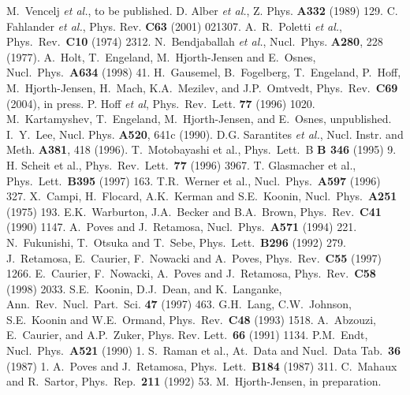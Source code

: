 \documentclass[twoside,12pt]{article}
\begin{document}
\begin{thebibliography}{200}
M.~Vencelj {\it et al.}, to be published.
 D. Alber {\it et al.}, Z. Phys. {\bf A332} (1989) 129.
 C. Fahlander {\it et al.}, Phys. Rev. {\bf C63} (2001) 021307.
 A.~R.~Poletti {\it et al.},
Phys.~Rev.~{\bf C10}  (1974) 2312.
 N.~Bendjaballah {\it et al.},
Nucl.~Phys. {\bf A280}, 228 (1977).
 A.\ Holt, T.\ Engeland, M.\ Hjorth-Jensen and E.\ Osnes,
Nucl.\ Phys.\ {\bf A634} (1998) 41.
H.~Gausemel, B.~Fogelberg, T.~Engeland, P.~Hoff, M.~Hjorth-Jensen, 
H.~Mach, K.A.~Mezilev, and J.P.~Omtvedt, Phys.~Rev.~{\bf C69} (2004), in press.
  P. Hoff {\em et al}, Phys.~Rev.~Lett. {\bf 77} (1996) 1020.  
 M.~Kartamyshev, T.~Engeland, M.~Hjorth-Jensen, and E.~Osnes,
unpublished. 
 I.~Y.~Lee, Nucl. Phys. {\bf A520}, 641c (1990).
 D.G. Sarantites {\it et al.}, Nucl. Instr. and Meth.
{\bf A381}, 418 (1996).
 T.\ Motobayashi et al.,
Phys.\ Lett.\ B {\bf B 346} (1995) 9.
 H. Scheit et al., Phys.\ Rev.\ Lett.\ {\bf 77} (1996) 3967.
 T. Glasmacher et al.,  Phys.\ Lett.\ {\bf B395} (1997) 163.
 T.R.\ Werner et al., Nucl.\ Phys.\ {\bf A597} (1996) 327.
 X.\ Campi, H.\ Flocard, A.K.\ Kerman and S.E.\ Koonin,
Nucl.\ Phys.\ {\bf A251} (1975) 193.
 E.K.\ Warburton, J.A.\ Becker and B.A.\ Brown, Phys.\
 Rev.\ {\bf C41} (1990) 1147.
 A.\ Poves and J.\ Retamosa, Nucl.\ Phys.\ {\bf A571}
(1994) 221.
 N.\ Fukunishi, T.\ Otsuka and T.\ Sebe,
Phys.\ Lett.\ {\bf B296} (1992) 279.
 J.\ Retamosa, E.\ Caurier, F.\ Nowacki and A.\ Poves,
Phys.\ Rev.\ {\bf C55} (1997) 1266.
 E.\ Caurier, F.\ Nowacki, A.\ Poves and J.\ Retamosa,
Phys.\ Rev.\  {\bf C58} (1998) 2033.
 S.E.\ Koonin, D.J.\ Dean, and K.\ Langanke,
Ann.\ Rev.\ Nucl.\ Part.\ Sci. {\bf 47} (1997) 463.
 G.H.\ Lang, C.W.\ Johnson, S.E.\ Koonin and W.E.\ Ormand,
Phys.\ Rev.\ {\bf C48} (1993) 1518.
 A.\ Abzouzi, E.\ Caurier, and A.P.\ Zuker, Phys.  Rev.
  Lett.\  {\bf 66} (1991) 1134.
 P.M.\ Endt, Nucl.\ Phys.\ {\bf A521} (1990) 1.
\bibitem{r:raman} S.\ Raman et al., At.\ Data and Nucl.\ Data Tab.\
{\bf 36} (1987) 1.
\bibitem{r:poves2} A.\ Poves and J.\ Retamosa, Phys.\ Lett.\ 
{\bf B184} (1987) 311.
\bibitem{ms92} C.\ Mahaux and R.\ Sartor, Phys.\ Rep.\
{\bf 211} (1992) 53. 
\bibitem{mhj99} M.\ Hjorth-Jensen, in preparation.

\end{thebibliography}
\end{document}
